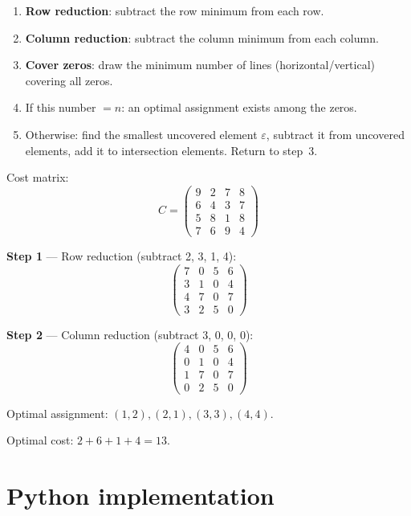 \begin{algorithme}[title=\textbf{Hungarian algorithm (Kuhn-Munkres method)}]
\begin{enumerate}
  \item \textbf{Row reduction}: subtract the row minimum from each row.
  \item \textbf{Column reduction}: subtract the column minimum from each
        column.
  \item \textbf{Cover zeros}: draw the minimum number of lines
        (horizontal/vertical) covering all zeros.
  \item If this number $= n$: an optimal assignment exists among the zeros.
  \item Otherwise: find the smallest uncovered element $\varepsilon$,
        subtract it from uncovered elements, add it to intersection elements.
        Return to step~3.
\end{enumerate}
\end{algorithme}

\begin{example}
Cost matrix:
\[
C = \begin{pmatrix}
  9 & 2 & 7 & 8 \\
  6 & 4 & 3 & 7 \\
  5 & 8 & 1 & 8 \\
  7 & 6 & 9 & 4
\end{pmatrix}
\]

\textbf{Step 1} --- Row reduction (subtract 2, 3, 1, 4):
\[
\begin{pmatrix}
  7 & 0 & 5 & 6 \\
  3 & 1 & 0 & 4 \\
  4 & 7 & 0 & 7 \\
  3 & 2 & 5 & 0
\end{pmatrix}
\]

\textbf{Step 2} --- Column reduction (subtract 3, 0, 0, 0):
\[
\begin{pmatrix}
  4 & 0 & 5 & 6 \\
  0 & 1 & 0 & 4 \\
  1 & 7 & 0 & 7 \\
  0 & 2 & 5 & 0
\end{pmatrix}
\]

Optimal assignment:
$(1,2), (2,1), (3,3), (4,4)$.

Optimal cost: $2 + 6 + 1 + 4 = 13$.
\end{example}

\section{Python implementation}

